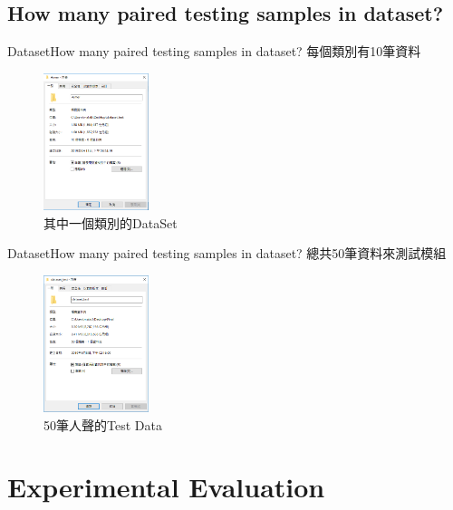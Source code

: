 \documentclass{beamer}
\begin{document}
\begin{CJK}{UTF8}{nkai}
\subsection{How many paired testing samples in  dataset?}
\begin{frame}{Dataset}{How many paired testing samples in  dataset?}
每個類別有10筆資料
\newline
\newline
\begin{figure}
\begin{center} 
\includegraphics[height=4cm]{testData.png}
\end{center}
\caption{其中一個類別的DataSet}
\end{figure}
\end{frame}

\begin{frame}{Dataset}{How many paired testing samples in  dataset?}
總共50筆資料來測試模組
\newline
\newline
\begin{figure}
\begin{center} 
\includegraphics[height=4cm]{6.png}
\end{center}
\caption{50筆人聲的Test Data}
\end{figure}
\end{frame}

\section{Experimental Evaluation}

\end{CJK}
\end{document}
